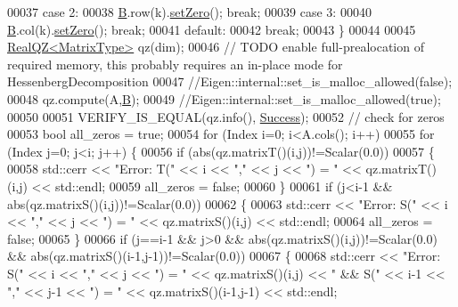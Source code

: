 \begin{DoxyCode}
00037   \textcolor{keywordflow}{case} 2:
00038     \hyperlink{group___core___module_class_eigen_1_1_matrix}{B}.row(k).\hyperlink{class_eigen_1_1_plain_object_base_ac21ad5f989f320e46958b75ac8d9a1da}{setZero}(); \textcolor{keywordflow}{break};
00039   \textcolor{keywordflow}{case} 3:
00040     \hyperlink{group___core___module_class_eigen_1_1_matrix}{B}.col(k).\hyperlink{class_eigen_1_1_plain_object_base_ac21ad5f989f320e46958b75ac8d9a1da}{setZero}(); \textcolor{keywordflow}{break};
00041   \textcolor{keywordflow}{default}:
00042     \textcolor{keywordflow}{break};
00043   \}
00044 
00045   \hyperlink{group___eigenvalues___module}{RealQZ<MatrixType>} qz(dim);
00046   \textcolor{comment}{// TODO enable full-prealocation of required memory, this probably requires an in-place mode for
       HessenbergDecomposition}
00047   \textcolor{comment}{//Eigen::internal::set\_is\_malloc\_allowed(false);}
00048   qz.compute(A,\hyperlink{group___core___module_class_eigen_1_1_matrix}{B});
00049   \textcolor{comment}{//Eigen::internal::set\_is\_malloc\_allowed(true);}
00050   
00051   VERIFY\_IS\_EQUAL(qz.info(), \hyperlink{group__enums_gga85fad7b87587764e5cf6b513a9e0ee5ea52581b035f4b59c203b8ff999ef5fcea}{Success});
00052   \textcolor{comment}{// check for zeros}
00053   \textcolor{keywordtype}{bool} all\_zeros = \textcolor{keyword}{true};
00054   \textcolor{keywordflow}{for} (Index i=0; i<A.cols(); i++)
00055     \textcolor{keywordflow}{for} (Index j=0; j<i; j++) \{
00056       \textcolor{keywordflow}{if} (abs(qz.matrixT()(i,j))!=Scalar(0.0))
00057       \{
00058         std::cerr << \textcolor{stringliteral}{"Error: T("} << i << \textcolor{stringliteral}{","} << j << \textcolor{stringliteral}{") = "} << qz.matrixT()(i,j) << std::endl;
00059         all\_zeros = \textcolor{keyword}{false};
00060       \}
00061       \textcolor{keywordflow}{if} (j<i-1 && abs(qz.matrixS()(i,j))!=Scalar(0.0))
00062       \{
00063         std::cerr << \textcolor{stringliteral}{"Error: S("} << i << \textcolor{stringliteral}{","} << j << \textcolor{stringliteral}{") = "} << qz.matrixS()(i,j) << std::endl;
00064         all\_zeros = \textcolor{keyword}{false};
00065       \}
00066       \textcolor{keywordflow}{if} (j==i-1 && j>0 && abs(qz.matrixS()(i,j))!=Scalar(0.0) && abs(qz.matrixS()(i-1,j-1))!=Scalar(0.0))
00067       \{
00068         std::cerr << \textcolor{stringliteral}{"Error: S("} << i << \textcolor{stringliteral}{","} << j << \textcolor{stringliteral}{") = "} << qz.matrixS()(i,j)  << \textcolor{stringliteral}{" && S("} << i-1 << \textcolor{stringliteral}{","}
       << j-1 << \textcolor{stringliteral}{") = "} << qz.matrixS()(i-1,j-1) << std::endl;

\end{DoxyCode}
